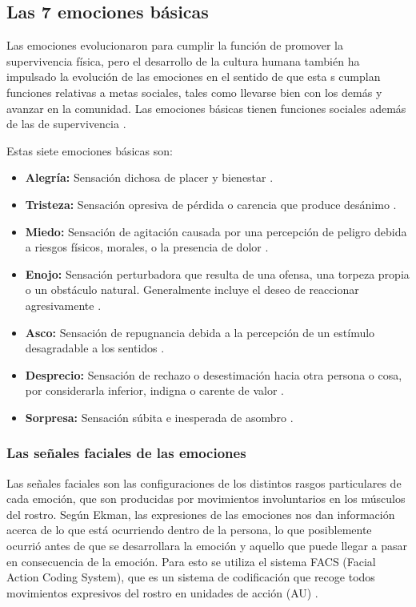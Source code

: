 \subsection*{Las 7 emociones básicas}
Las emociones evolucionaron para cumplir la función de promover la supervivencia física, pero el desarrollo de la cultura humana también ha impulsado la evolución de las emociones en el sentido de que esta
s cumplan funciones relativas a metas sociales, tales como llevarse bien con los demás y avanzar en la comunidad. Las emociones básicas tienen funciones sociales además de las de supervivencia \cite{rulicki2012cnv}.

Estas siete emociones básicas son:
\begin{itemize}
\item \textbf{Alegría:} Sensación dichosa de placer y bienestar \cite{rulicki2012cnv}.
\item \textbf{Tristeza:} Sensación opresiva de pérdida o carencia que produce desánimo \cite{rulicki2012cnv}.
\item \textbf{Miedo:} Sensación de agitación causada por una percepción de peligro debida a riesgos físicos, morales, o la presencia de dolor \cite{rulicki2012cnv}.
\item \textbf{Enojo:} Sensación perturbadora que resulta de una ofensa, una torpeza propia o un obstáculo natural. Generalmente incluye el deseo de reaccionar agresivamente \cite{rulicki2012cnv}.
\item \textbf{Asco:} Sensación de repugnancia debida a la percepción de un estímulo desagradable a los sentidos \cite{rulicki2012cnv}.
\item \textbf{Desprecio:} Sensación de rechazo o desestimación hacia otra persona o cosa, por considerarla inferior, indigna o carente de valor \cite{rulicki2012cnv}.
\item \textbf{Sorpresa:} Sensación súbita e inesperada de asombro \cite{rulicki2012cnv}.
\end{itemize}
\subsubsection*{Las señales faciales de las emociones}
Las señales faciales son las configuraciones de los distintos rasgos particulares de cada emoción, que son producidas por movimientos involuntarios en los músculos del rostro. Según Ekman, las expresiones de las emociones nos dan información acerca de lo que está ocurriendo dentro de la persona, lo que posiblemente ocurrió antes de que se desarrollara la emoción y aquello que puede llegar a pasar en consecuencia de la emoción. Para esto se utiliza el sistema FACS (Facial Action Coding System), que es un sistema de codificación que recoge todos movimientos expresivos del rostro en unidades de acción (AU) \cite{ekman2017rostro}.

